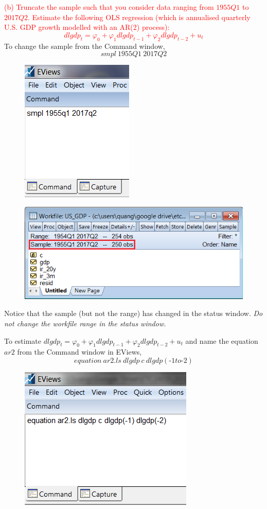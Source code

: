 \documentclass[12pt]{report}
\begin{document}
\newpage
\noindent \textcolor{red}
{
	(b) Truncate the sample such that you consider data ranging from $1955Q1$ to $2017Q2$. Estimate the following OLS regression (which is annualised quarterly U.S. GDP growth modelled with an AR(2) process): $$dlgdp_t = \varphi_0 + \varphi_1dlgdp_{t-1} + \varphi_2dlgdp_{t-2} + u_t$$
}
\noindent To change the sample from the Command window, $$smpl\ 1955Q1\ 2017Q2$$
\begin{figure}[H]
	\centerline{\includegraphics{q3_2}}
\end{figure}
\vspace{-\baselineskip}
\begin{figure}[H]
	\centerline{\includegraphics{q3_3}}
\end{figure}
\vspace{-\baselineskip}
\noindent Notice that the sample (but not the range) has changed in the status window. \textit{Do not change the workfile range in the status window.}

\newpage
\noindent To estimate $dlgdp_t = \varphi_0 + \varphi_1dlgdp_{t-1} + \varphi_2dlgdp_{t-2} + u_t$ and name the equation $ar2$ from the Command window in EViews, 
$$equation\ ar2.ls\ dlgdp\ c\ dlgdp(\text{-}1to\text{-2})$$
\begin{figure}[H]
	\centerline{\includegraphics{tute11_1}}
\end{figure}
\vspace{-\baselineskip}
\end{document}
